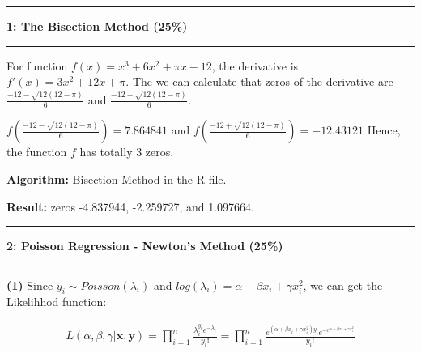 \documentclass[11pt]{article}
\newcommand\question[2]{\vspace{.25in}\hrule\textbf{#1: #2}\vspace{.5em}\hrule\vspace{.10in}}
\renewcommand\part[1]{\vspace{.10in}\textbf{(#1)}}
\newcommand\algorithm{\vspace{.10in}\textbf{Algorithm: }}
\newcommand\result{\vspace{.10in}\textbf{Result: }}
\begin{document}
\raggedright
\newcommand\NAME{ZHANG Xinfang}  %
\newcommand\ANDREWID{1155141566}     %
\newcommand\HWNUM{1}              %

\question{1}{The Bisection Method (25\%)} 
For function $f(x) = x^3 + 6x^2 + \pi x - 12$, the derivative is $f'(x) = 3x^2 + 12x + \pi$. The we can calculate that 
zeros of the derivative are $\frac{-12 - \sqrt{12(12-\pi)}}{6}$ and $\frac{-12 + \sqrt{12(12-\pi)}}{6}$.

$f(\frac{-12 - \sqrt{12(12-\pi)}}{6}) = 7.864841$ and $f(\frac{-12 + \sqrt{12(12-\pi)}}{6}) = -12.43121$
Hence, the function $f$ has totally 3 zeros.

\algorithm{Bisection Method in the R file.}

\result{zeros -4.837944, -2.259727, and 1.097664.}

\question{2}{Poisson Regression - Newton's Method (25\%)}

\part{1} Since $y_i \sim Poisson(\lambda_i)$ and $log(\lambda_i) = \alpha + \beta x_i + \gamma x_i^2$, we can get the Likelihhod function:

\begin{align*}
    L(\alpha, \beta, \gamma|\mathbf{x}, \mathbf{y}) = \prod_{i=1}^{n} \frac{\lambda_i^{y_i} e^{-\lambda_i}}{y_i !} = \prod_{i=1}^{n} \frac{e^{(\alpha + \beta x_i + \gamma x_i^2)y_i} e^{-e^{\alpha + \beta x_i + \gamma x_i^2}}}{y_i !}
\end{align*}
\end{document}
